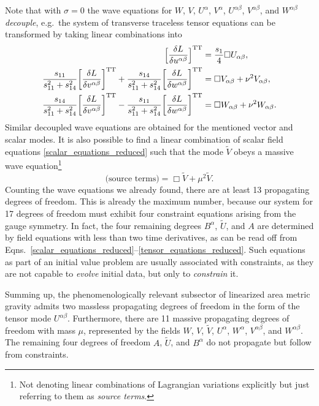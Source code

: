 Note that with $\sigma=0$ the wave equations for $W$, $V$, $U^\alpha$, $V^\alpha$, $U^{\alpha\beta}$, $V^{\alpha\beta}$, and $W^{\alpha\beta}$ \emph{decouple}, e.g.~the system of transverse traceless tensor equations can be transformed by taking linear combinations into
\begingroup\allowdisplaybreaks
\begin{align}\footnotesize
  \bigg\lbrack\frac{\delta L}{\delta u^{\alpha\beta}}\bigg\rbrack^\text{TT} = {} & \frac{s_1}{4} \Box U_{\alpha\beta}, \nonumber \\
  \frac{s_{11}}{s_{11}^2 + s_{14}^2} \bigg\lbrack\frac{\delta L}{\delta v^{\alpha\beta}}\bigg\rbrack^\text{TT} + \frac{s_{14}}{s_{11}^2 + s_{14}^2} \bigg\lbrack\frac{\delta L}{\delta w^{\alpha\beta}}\bigg\rbrack^\text{TT} = {} & \Box V_{\alpha\beta} + \nu^2 V_{\alpha\beta}, \label{tensor_equations_decoupled} \\
  \frac{s_{14}}{s_{11}^2 + s_{14}^2} \bigg\lbrack\frac{\delta L}{\delta v^{\alpha\beta}}\bigg\rbrack^\text{TT} - \frac{s_{11}}{s_{11}^2 + s_{14}^2} \bigg\lbrack\frac{\delta L}{\delta w^{\alpha\beta}}\bigg\rbrack^\text{TT} = {} & \Box W_{\alpha\beta} + \nu^2 W_{\alpha\beta}. \nonumber
\end{align}
\endgroup
Similar decoupled wave equations are obtained for the mentioned vector and scalar modes. It is also possible to find a linear combination of scalar field equations \eqref{scalar_equations_reduced} such that the mode $\tilde V$ obeys a massive wave equation\footnote{Not denoting linear combinations of Lagrangian variations explicitly but just referring to them as \emph{source terms}.}
\begin{equation}\label{trace_massive_wave}
  \text{(source terms)} = \Box \tilde V + \mu^2 \tilde V.
\end{equation}
Counting the wave equations we already found, there are at least 13 propagating degrees of freedom. This is already the maximum number, because our system for 17 degrees of freedom must exhibit four constraint equations arising from the gauge symmetry\cite{}. In fact, the four remaining degrees $B^\alpha$, $\tilde U$, and $A$ are determined by field equations with less than two time derivatives, as can be read off from Eqns.~\eqref{scalar_equations_reduced}--\eqref{tensor_equations_reduced}. Such equations as part of an initial value problem are usually associated with constraints, as they are not capable to \emph{evolve} initial data, but only to \emph{constrain} it.\cite{}

Summing up, the phenomenologically relevant subsector of linearized area metric gravity admits two massless propagating degrees of freedom in the form of the tensor mode $U^{\alpha\beta}$. Furthermore, there are 11 massive propagating degrees of freedom with mass $\mu$, represented by the fields $W$, $V$, $\tilde V$, $U^\alpha$, $W^\alpha$, $V^{\alpha\beta}$, and $W^{\alpha\beta}$. The remaining four degrees of freedom $A$, $\tilde U$, and $B^\alpha$ do not propagate but follow from constraints.

